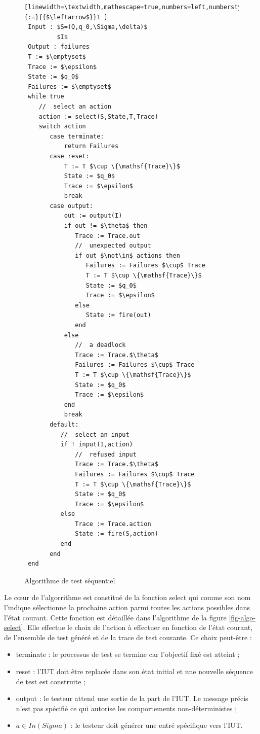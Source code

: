 \begin{figure}[htbp]
    \centering
 \begin{lstlisting}[linewidth=\textwidth,mathescape=true,numbers=left,numberstyle=\tiny,literate={:=}{{$\leftarrow$}}1 ]
 Input : $S=(Q,q_0,\Sigma,\delta)$           
         $I$           
 Output : failures     
 T := $\emptyset$
 Trace := $\epsilon$ 
 State := $q_0$ 
 Failures := $\emptyset$
 while true 
    //  select an action 
    action := select(S,State,T,Trace)
    switch action
       case terminate: 
           return Failures
       case reset:
           T := T $\cup \{\mathsf{Trace}\}$
           State := $q_0$
           Trace := $\epsilon$
           break
       case output: 
           out := output(I) 
           if out != $\theta$ then
              Trace := Trace.out
              //  unexpected output 
              if out $\not\in$ actions then 
                 Failures := Failures $\cup$ Trace
                 T := T $\cup \{\mathsf{Trace}\}$
                 State := $q_0$
                 Trace := $\epsilon$
              else 
                 State := fire(out)
              end
           else 
              //  a deadlock  
              Trace := Trace.$\theta$
              Failures := Failures $\cup$ Trace
              T := T $\cup \{\mathsf{Trace}\}$
              State := $q_0$
              Trace := $\epsilon$
           end
           break
       default:
          //  select an input 
          if ! input(I,action) 
              //  refused input 
              Trace := Trace.$\theta$
              Failures := Failures $\cup$ Trace
              T := T $\cup \{\mathsf{Trace}\}$
              State := $q_0$
              Trace := $\epsilon$
          else
              Trace := Trace.action
              State := fire(S,action)
          end
       end
 end
 \end{lstlisting}
 \caption{Algorithme de test s\'equentiel}
 \label{fig-algo-test-base}
 \end{figure}

Le c\oe ur de l'algorrithme est constitu\'e de la fonction
\textsf{select} qui comme son nom  l'indique s\'electionne la
prochaine action parmi toutes les actions possibles dans
l'\'etat courant. Cette fonction est d\'etaill\'ee dans
l'algorithme de la figure \ref{fig-algo-select}. 
Elle  effectue le choix de l'action \`a effectuer  en fonction de l'\'etat
courant, de l'ensemble de test g\'en\'er\'e et de la trace de test
courante. Ce choix peut-\^etre :
\begin{itemize}
  \item \textsf{terminate} : le processus de test se termine car
  l'objectif fix\'e est atteint ;
\item \textsf{reset} : l'\textsf{IUT} doit \^etre replac\'ee dans
  son \'etat initial et une nouvelle s\'equence de test est
  construite ;
\item \textsf{output} : le testeur attend une sortie de la part de
  l'\textsf{IUT}. Le message pr\'ecis n'est pas sp\'ecifi\'e ce qui
  autorise les comportements non-d\'eterministes ;
\item $a\in In(Sigma)$ : le testeur doit g\'en\'erer une entr\'e
  sp\'ecifique vers l'\textsf{IUT}.
\end{itemize}

